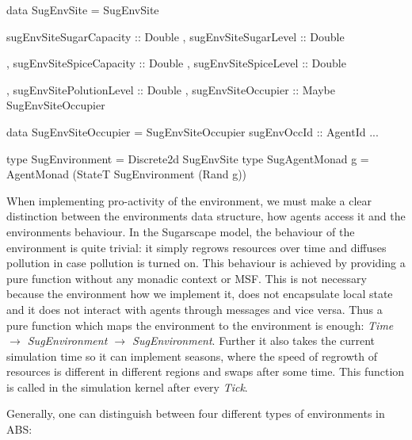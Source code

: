 \begin{HaskellCode}
data SugEnvSite = SugEnvSite 
  { sugEnvSiteSugarCapacity :: Double
  , sugEnvSiteSugarLevel    :: Double

  , sugEnvSiteSpiceCapacity :: Double
  , sugEnvSiteSpiceLevel    :: Double

  , sugEnvSitePolutionLevel :: Double
  , sugEnvSiteOccupier      :: Maybe SugEnvSiteOccupier
  }
  
data SugEnvSiteOccupier = SugEnvSiteOccupier 
  { sugEnvOccId :: AgentId
  ...
  }

type SugEnvironment  = Discrete2d SugEnvSite
type SugAgentMonad g = AgentMonad (StateT SugEnvironment (Rand g))
\end{HaskellCode}

When implementing pro-activity of the environment, we must make a clear distinction between the environments data structure, how agents access it and the environments behaviour. In the Sugarscape model, the behaviour of the environment is quite trivial: it simply regrows resources over time and diffuses pollution in case pollution is turned on. This behaviour is achieved by providing a pure function without any monadic context or MSF. This is not necessary because the environment how we implement it, does not encapsulate local state and it does not interact with agents through messages and vice versa. Thus a pure function which maps the environment to the environment is enough: \textit{Time $\rightarrow$ SugEnvironment $\rightarrow$ SugEnvironment}. Further it also takes the current simulation time so it can implement seasons, where the speed of regrowth of resources is different in different regions and swaps after some time. This function is called in the simulation kernel after every \textit{Tick}.

Generally, one can distinguish between four different types of environments in ABS:

